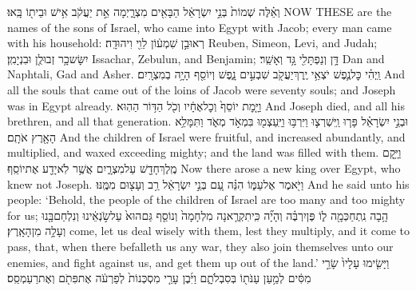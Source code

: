 \documentclass[11pt, openany]{book}
\begin{document}


\clearpage
\mainmatter

\setmainheader


\setcounter{chap}{1}
\setcounter{verse}{1}
{וְאֵ֗לֶּה שְׁמוֹת֙ בְּנֵ֣י יִשְׂרָאֵ֔ל הַבָּאִ֖ים מִצְרָ֑יְמָה אֵ֣ת יַעֲקֹ֔ב אִ֥ישׁ וּבֵית֖וֹ בָּֽאוּ׃}
{NOW THESE are the names of the sons of Israel, who came into Egypt with Jacob; every man came with his household:}
{רְאוּבֵ֣ן שִׁמְע֔וֹן לֵוִ֖י וִיהוּדָֽה׃}
{Reuben, Simeon, Levi, and Judah;}
{יִשָּׂשכָ֥ר זְבוּלֻ֖ן וּבִנְיָמִֽן׃}
{Issachar, Zebulun, and Benjamin;}
{דָּ֥ן וְנַפְתָּלִ֖י גָּ֥ד וְאָשֵֽׁר׃}
{Dan and Naphtali, Gad and Asher.}
{וַֽיְהִ֗י כׇּל\maqqaf נֶ֛פֶשׁ יֹצְאֵ֥י יֶֽרֶךְ\maqqaf יַעֲקֹ֖ב שִׁבְעִ֣ים נָ֑פֶשׁ וְיוֹסֵ֖ף הָיָ֥ה בְמִצְרָֽיִם׃}
{And all the souls that came out of the loins of Jacob were seventy souls; and Joseph was in Egypt already.}
{וַיָּ֤מׇת יוֹסֵף֙ וְכׇל\maqqaf אֶחָ֔יו וְכֹ֖ל הַדּ֥וֹר הַהֽוּא׃}
{And Joseph died, and all his brethren, and all that generation.}
{וּבְנֵ֣י יִשְׂרָאֵ֗ל פָּר֧וּ וַֽיִּשְׁרְצ֛וּ וַיִּרְבּ֥וּ וַיַּֽעַצְמ֖וּ בִּמְאֹ֣ד מְאֹ֑ד וַתִּמָּלֵ֥א הָאָ֖רֶץ אֹתָֽם׃ \petucha }
{And the children of Israel were fruitful, and increased abundantly, and multiplied, and waxed exceeding mighty; and the land was filled with them.}
{וַיָּ֥קׇם מֶֽלֶךְ\maqqaf חָדָ֖שׁ עַל\maqqaf מִצְרָ֑יִם אֲשֶׁ֥ר לֹֽא\maqqaf יָדַ֖ע אֶת\maqqaf יוֹסֵֽף׃}
{Now there arose a new king over Egypt, who knew not Joseph.}
{וַיֹּ֖אמֶר אֶל\maqqaf עַמּ֑וֹ הִנֵּ֗ה עַ֚ם בְּנֵ֣י יִשְׂרָאֵ֔ל רַ֥ב וְעָצ֖וּם מִמֶּֽנּוּ׃}
{And he said unto his people: ‘Behold, the people of the children of Israel are too many and too mighty for us;}
{הָ֥בָה נִֽתְחַכְּמָ֖ה ל֑וֹ פֶּן\maqqaf יִרְבֶּ֗ה וְהָיָ֞ה כִּֽי\maqqaf תִקְרֶ֤אנָה מִלְחָמָה֙ וְנוֹסַ֤ף גַּם\maqqaf הוּא֙ עַל\maqqaf שֹׂ֣נְאֵ֔ינוּ וְנִלְחַם\maqqaf בָּ֖נוּ וְעָלָ֥ה מִן\maqqaf הָאָֽרֶץ׃}
{come, let us deal wisely with them, lest they multiply, and it come to pass, that, when there befalleth us any war, they also join themselves unto our enemies, and fight against us, and get them up out of the land.’}
{וַיָּשִׂ֤ימוּ עָלָיו֙ שָׂרֵ֣י מִסִּ֔ים לְמַ֥עַן עַנֹּת֖וֹ בְּסִבְלֹתָ֑ם וַיִּ֜בֶן עָרֵ֤י מִסְכְּנוֹת֙ לְפַרְעֹ֔ה אֶת\maqqaf פִּתֹ֖ם וְאֶת\maqqaf רַעַמְסֵֽס׃}
\end{document}
